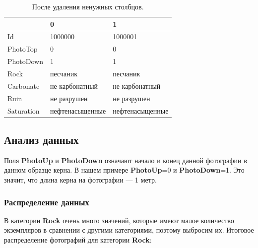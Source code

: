 \documentclass[14pt]{matmex-diploma}
\begin{document}
    \begin{table}[h!]
        \centering
        \begin{tabular}{|l|l|l|}
            \hline
            {} &                0 &                1 \\
            \hline
            Id             &          1000000 &          1000001 \\
            PhotoTop       &                0 &                0 \\
            PhotoDown      &                1 &                1 \\
            Rock           &         песчаник &         песчаник \\
            Carbonate      &   не карбонатный &   не карбонатный \\
            Ruin           &      не разрушен &      не разрушен \\
            Saturation     &  нефтенасыщенные &  нефтенасыщенные \\
            \hline
        \end{tabular}
        \caption{После удаления ненужных столбцов.}
        \label{sample_table_cleaned}  
        \vspace*{2 cm}
    \end{table}   
    
    \FloatBarrier
    
    \subsection{Анализ данных}
        
        Поля \textbf{PhotoUp} и \textbf{PhotoDown} означают начало и конец данной фотографии в данном образце керна. В нашем примере \textbf{PhotoUp}=0 и \textbf{PhotoDown}=1. Это значит, что длина керна на фотографии — 1 метр.
        
        \subsubsection*{Распределение данных}
        
        
        В категории \textbf{Rock} очень много значений, которые имеют малое количество экземпляров в сравнении с другими категориями, поэтому выбросим их. Итоговое распределение фотографий для категории \textbf{Rock}:
        
\end{document}

